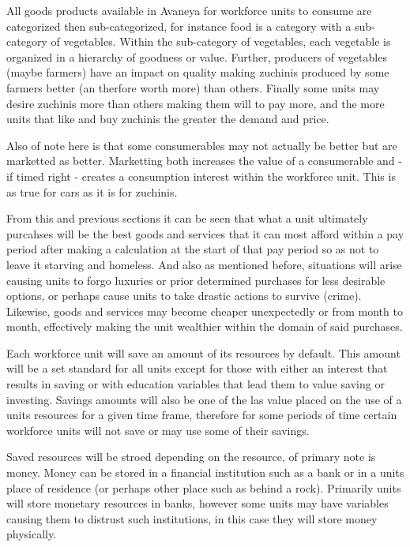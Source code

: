 All goods products available in Avaneya for workforce units to consume are categorized then sub-categorized, for instance food is a category with a sub-category of vegetables. Within the sub-category of vegetables, each vegetable is organized in a hierarchy of goodness or value. Further, producers of vegetables (maybe farmers) have an impact on quality making zuchinis produced by some farmers better (an therfore worth more) than others. Finally some units may desire zuchinis more than others making them will to pay more, and the more units that like and buy zuchinis the greater the demand and price.

Also of note here is that some consumerables may not actually be better but are marketted as better. Marketting both increases the value of a consumerable and - if timed right - creates a consumption interest within the workforce unit. This is as true for cars as it is for zuchinis.   

From this and previous sections it can be seen that what a unit ultimately purcahses will be the best goods and services that it can most afford within a pay period after making a calculation at the start of that pay period so as not to leave it starving and homeless. And also as mentioned before, situations will arise causing units to forgo luxuries or prior determined purchases for less desirable options, or perhaps cause units to take drastic actions to survive (crime). Likewise, goods and services may become cheaper unexpectedly or from month to month, effectively making the unit wealthier within the domain of said purchases.

Each workforce unit will save an amount of its resources by default. This amount will be a set standard for all units except for those with either an interest that results in saving or with education variables that lead them to value saving or investing. Savings amounts will also be one of the las value placed on the use of a units resources for a given time frame, therefore for some periods of time certain workforce units will not save or may use some of their savings.

Saved resources will be stroed depending on the resource, of primary note is money. Money can be stored in a financial institution such as a bank or in a units place of residence (or perhaps other place such as behind a rock). Primarily units will store monetary resources in banks, however some units may have variables causing them to distrust such institutions, in this case they will store money physically. 


